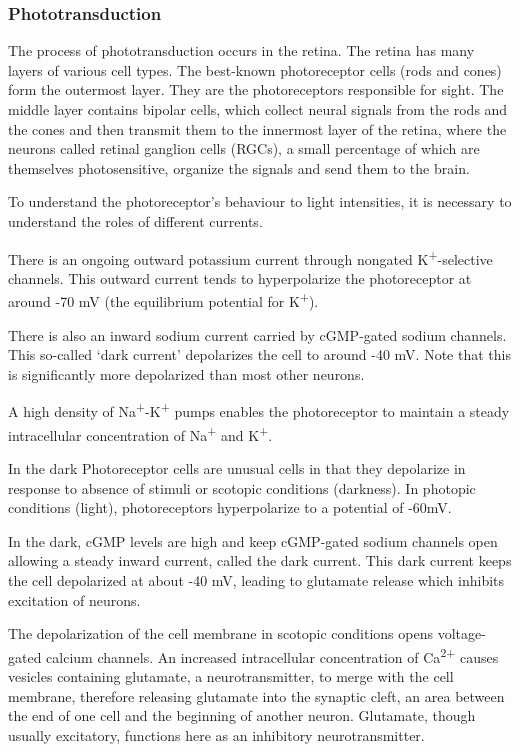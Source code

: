 \hypertarget{phototransduction}{%
\subsubsection{Phototransduction}\label{phototransduction}}

The process of phototransduction occurs in the retina. The retina has many layers of various cell types. The best-known photoreceptor cells (rods and cones) form the outermost layer. They are the photoreceptors responsible for sight. The middle layer contains bipolar cells, which collect neural signals from the rods and the cones and then transmit them to the innermost layer of the retina, where the neurons called retinal ganglion cells (RGCs), a small percentage of which are themselves photosensitive, organize the signals and send them to the brain.

To understand the photoreceptor's behaviour to light intensities, it is necessary to understand the roles of different currents.

There is an ongoing outward potassium current through nongated K\textsuperscript{+}-selective channels. This outward current tends to hyperpolarize the photoreceptor at around -70 mV (the equilibrium potential for K\textsuperscript{+}).

There is also an inward sodium current carried by cGMP-gated sodium channels. This so-called `dark current' depolarizes the cell to around -40 mV. Note that this is significantly more depolarized than most other neurons.

A high density of Na\textsuperscript{+}-K\textsuperscript{+} pumps enables the photoreceptor to maintain a steady intracellular concentration of Na\textsuperscript{+} and K\textsuperscript{+}.

In the dark
Photoreceptor cells are unusual cells in that they depolarize in response to absence of stimuli or scotopic conditions (darkness). In photopic conditions (light), photoreceptors hyperpolarize to a potential of -60mV.

In the dark, cGMP levels are high and keep cGMP-gated sodium channels open allowing a steady inward current, called the dark current. This dark current keeps the cell depolarized at about -40 mV, leading to glutamate release which inhibits excitation of neurons.

The depolarization of the cell membrane in scotopic conditions opens voltage-gated calcium channels. An increased intracellular concentration of Ca\textsuperscript{2+} causes vesicles containing glutamate, a neurotransmitter, to merge with the cell membrane, therefore releasing glutamate into the synaptic cleft, an area between the end of one cell and the beginning of another neuron. Glutamate, though usually excitatory, functions here as an inhibitory neurotransmitter.

